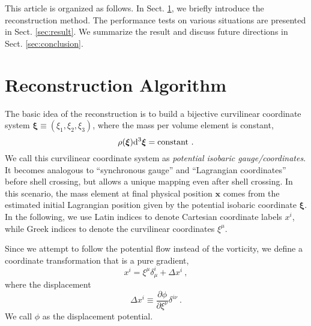 \documentclass[iop]{emulateapj}
\newcommand{\be}{\begin{equation}}
\newcommand{\ee}{\end{equation}}
\newcommand{\dif}{\mathrm{d}}
\newcommand{\vecx}{{\bm{x}}}
\newcommand{\vecxi}{{\bm{\xi}}}
\begin{document}
{This article is organized as follows.
In Sect. \ref{sec:recon}, we briefly introduce the reconstruction method.
The performance tests on various situations are presented in Sect. \ref{sec:result}.
We summarize the result and discuss future directions in Sect. \ref{sec:conclusion}.


\section{Reconstruction Algorithm}
\label{sec:recon}


The basic idea of the reconstruction is to build a bijective curvilinear coordinate system $\vecxi\equiv(\xi_1,\xi_2,
\xi_3)$, where the mass per volume element is constant,
\be
\rho(\vecxi)\dif^3\vecxi={\rm constant}\ .
\ee
We call this curvilinear coordinate system as {\it potential isobaric gauge/coordinates}.
It becomes analogous to ``synchronous gauge'' and ``Lagrangian coordinates'' before shell crossing, but allows a unique mapping even after shell crossing.
In this scenario, the mass element at final physical position $\vecx$ comes from the estimated initial Lagrangian position given by the potential isobaric coordinate $\vecxi$.
In the following, we use Latin indices to denote Cartesian coordinate labels $x^i$, while Greek indices to denote the curvilinear coordinates $\xi^\mu$.

Since we attempt to follow the potential flow instead of the vorticity, we define a coordinate transformation that is a pure gradient,
\be
x^i=\xi^\mu\delta_\mu^i+\Delta x^i\ ,
\ee
where the displacement
\be
\Delta x^i\equiv\frac{\partial\phi}{\partial\xi^\nu}\delta^{i\nu}\ .
\ee
We call $\phi$ as the displacement potential.

}
\end{document}
